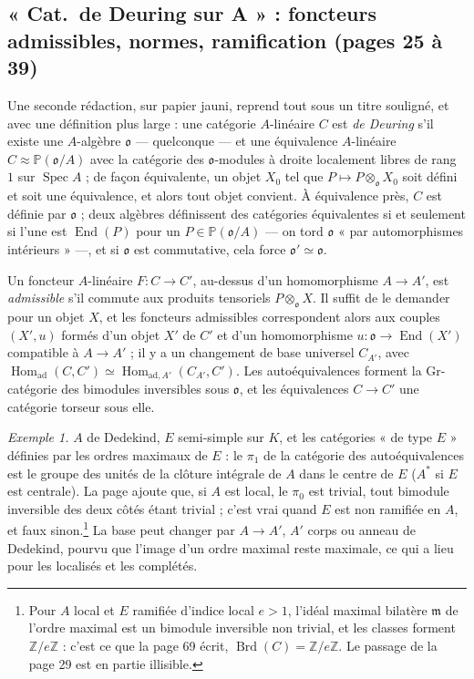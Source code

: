 \documentclass[11pt,a4paper]{article}
\begin{document}
\subsection*{« Cat.\ de Deuring sur A » : foncteurs admissibles, normes, ramification (pages 25 à 39)}

Une seconde rédaction, sur papier jauni, reprend tout sous un titre souligné,
et avec une définition plus large : une catégorie $A$-linéaire $C$ est \emph{de
Deuring} s'il existe une $A$-algèbre $\mathfrak{o}$ --- quelconque --- et une
équivalence $A$-linéaire $C \approx \mathbb{P}(\mathfrak{o}/A)$ avec la
catégorie des $\mathfrak{o}$-modules à droite localement libres de rang $1$ sur
$\operatorname{Spec} A$ ; de façon équivalente, un objet $X_{0}$ tel que $P
\mapsto P \otimes_{\mathfrak{o}} X_{0}$ soit défini et soit une équivalence, et
alors tout objet convient. À équivalence près, $C$ est définie par
$\mathfrak{o}$ ; deux algèbres définissent des catégories équivalentes si et
seulement si l'une est $\operatorname{End}(P)$ pour un $P \in
\mathbb{P}(\mathfrak{o}/A)$ --- on tord $\mathfrak{o}$ « par automorphismes
intérieurs » ---, et si $\mathfrak{o}$ est commutative, cela force
$\mathfrak{o}' \simeq \mathfrak{o}$.

Un foncteur $A$-linéaire $F \colon C \to C'$, au-dessus d'un homomorphisme
$A \to A'$, est \emph{admissible} s'il commute aux produits tensoriels
$P \otimes_{\mathfrak{o}} X$. Il suffit de le demander pour un objet $X$, et
les foncteurs admissibles correspondent alors aux couples $(X', u)$ formés d'un
objet $X'$ de $C'$ et d'un homomorphisme $u \colon \mathfrak{o} \to
\operatorname{End}(X')$ compatible à $A \to A'$ ; il y a un changement de base
universel $C_{A'}$, avec $\operatorname{Hom}_{\mathrm{ad}}(C, C') \simeq
\operatorname{Hom}_{\mathrm{ad}, A'}(C_{A'}, C')$. Les autoéquivalences
forment la Gr-catégorie des bimodules inversibles sous $\mathfrak{o}$, et les
équivalences $C \to C'$ une catégorie torseur sous elle.

\emph{Exemple 1.} $A$ de Dedekind, $E$ semi-simple sur $K$, et les catégories
« de type $E$ » définies par les ordres maximaux de $E$ : le $\pi_{1}$ de la
catégorie des autoéquivalences est le groupe des unités de la clôture intégrale
de $A$ dans le centre de $E$ ($A^{*}$ si $E$ est centrale). La page ajoute que,
si $A$ est local, le $\pi_{0}$ est trivial, tout bimodule inversible des deux
côtés étant trivial ; c'est vrai quand $E$ est non ramifiée en $A$, et faux
sinon.\footnote{Pour $A$ local et $E$ ramifiée d'indice local $e > 1$, l'idéal
maximal bilatère $\mathfrak{m}$ de l'ordre maximal est un bimodule inversible
non trivial, et les classes forment $\mathbb{Z}/e\mathbb{Z}$ : c'est ce que la
page 69 écrit, $\operatorname{Brd}(C) = \mathbb{Z}/e\mathbb{Z}$. Le passage de
la page 29 est en partie illisible.} La base peut changer par $A \to A'$, $A'$
corps ou anneau de Dedekind, pourvu que l'image d'un ordre maximal reste
maximale, ce qui a lieu pour les localisés et les complétés.
\end{document}
